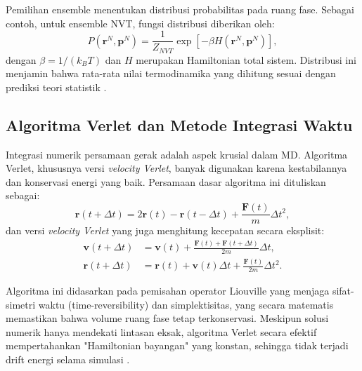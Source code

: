 Pemilihan ensemble menentukan distribusi probabilitas pada ruang fase. Sebagai contoh, untuk ensemble NVT, fungsi distribusi diberikan oleh:
\begin{equation}
    P(\mathbf{r}^N, \mathbf{p}^N) = \frac{1}{Z_{NVT}} \exp\left[-\beta H(\mathbf{r}^N, \mathbf{p}^N)\right],
\end{equation}
dengan \(\beta = 1/(k_B T)\) dan \(H\) merupakan Hamiltonian total sistem. Distribusi ini menjamin bahwa rata-rata nilai termodinamika yang dihitung sesuai dengan prediksi teori statistik \citep{kardar_statistical_2007}.

\subsection{Algoritma Verlet dan Metode Integrasi Waktu}
Integrasi numerik persamaan gerak adalah aspek krusial dalam MD. Algoritma Verlet, khususnya versi \emph{velocity Verlet}, banyak digunakan karena kestabilannya dan konservasi energi yang baik. Persamaan dasar algoritma ini dituliskan sebagai:
\begin{equation}
    \mathbf{r}(t+\Delta t) = 2\mathbf{r}(t) - \mathbf{r}(t-\Delta t) + \frac{\mathbf{F}(t)}{m}\Delta t^2,
\end{equation}
dan versi \emph{velocity Verlet} yang juga menghitung kecepatan secara eksplisit:
\begin{align}
    \mathbf{v}(t+\Delta t) &= \mathbf{v}(t) + \frac{\mathbf{F}(t) + \mathbf{F}(t+\Delta t)}{2m}\Delta t, \\
    \mathbf{r}(t+\Delta t) &= \mathbf{r}(t) + \mathbf{v}(t)\Delta t + \frac{\mathbf{F}(t)}{2m}\Delta t^2.
\end{align}

Algoritma ini didasarkan pada pemisahan operator Liouville yang menjaga sifat-simetri waktu (time-reversibility) dan simplektisitas, yang secara matematis memastikan bahwa volume ruang fase tetap terkonservasi. Meskipun solusi numerik hanya mendekati lintasan eksak, algoritma Verlet secara efektif mempertahankan "Hamiltonian bayangan" yang konstan, sehingga tidak terjadi drift energi selama simulasi \citep{swope_computer_1982}.

